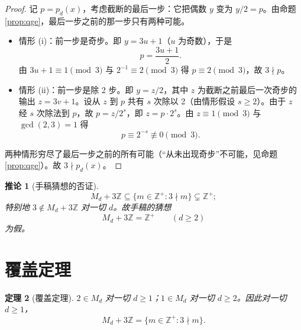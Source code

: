 \documentclass[11pt]{article}
\newtheorem{theorem}{定理}[section]
\newtheorem{corollary}[theorem]{推论}
\theoremstyle{definition}
\theoremstyle{definition}
\theoremstyle{remark}
\begin{document}
\begin{proof}
记 \(p=p_d(x)\)，考虑截断的最后一步：它把偶数 \(y\) 变为 \(y/2=p\)。由命题 \ref{prop:qge}，最后一步之前的那一步只有两种可能。
\begin{itemize}
\item 情形 (i)：前一步是奇步。即 \(y=3u+1\)（\(u\) 为奇数），于是
\[
p=\frac{3u+1}{2}.
\]
由 \(3u+1\equiv1\pmod3\) 与 \(2^{-1}\equiv2\pmod3\) 得 \(p\equiv2\pmod3\)，故 \(3\nmid p\)。
\item 情形 (ii)：前一步是除 2 步。即 \(y=z/2\)，其中 \(z\) 为截断之前最后一次奇步的输出 \(z=3v+1\)。设从 \(z\) 到 \(p\) 共有 \(s\) 次除以 2（由情形假设 \(s\ge2\)）。由于 \(z\) 经 \(s\) 次除法到 \(p\)，故 \(p=z/2^s\)，即 \(z=p\cdot2^{s}\)。由 \(z\equiv1\pmod3\) 与 \(\gcd(2,3)=1\) 得
\[
p\equiv2^{-s}\not\equiv0\pmod3.
\]
\end{itemize}
两种情形穷尽了最后一步之前的所有可能（“从未出现奇步”不可能，见命题 \ref{prop:qge}）。故 \(3\nmid p_d(x)\)。
\end{proof}

\begin{corollary}[手稿猜想的否证]\label{cor:subset}
\[
M_d+3\mathbb Z\subseteq\{m\in\mathbb Z^+:3\nmid m\}\subsetneq\mathbb Z^+;
\]
特别地 \(3\notin M_d+3\mathbb Z\) 对一切 \(d\)。故手稿的猜想
\[
M_d+3\mathbb Z=\mathbb Z^+\qquad(d\ge2)
\]
为假。
\end{corollary}

\section{覆盖定理}

\begin{theorem}[覆盖定理]\label{thm:cover}
\(2\in M_d\) 对一切 \(d\ge1\)；\(1\in M_d\) 对一切 \(d\ge2\)。因此对一切 \(d\ge1\)，
\[
M_d+3\mathbb Z=\{m\in\mathbb Z^+:3\nmid m\}.
\]
\end{theorem}
\end{document}
